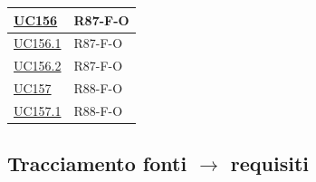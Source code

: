 \begin{longtable}{|p{2.8cm}|p{10.2cm}|}
	\hyperlink{uc156}{UC156}     & R87-F-O \\ \hline
	\hyperlink{uc156.1}{UC156.1} & R87-F-O \\ \hline
	\hyperlink{uc156.2}{UC156.2} & R87-F-O \\ \hline
	\hyperlink{uc157}{UC157}     & R88-F-O \\ \hline
	\hyperlink{uc157.1}{UC157.1} & R88-F-O \\ \hline

\end{longtable}

\subsection{Tracciamento fonti $\rightarrow$ requisiti}
